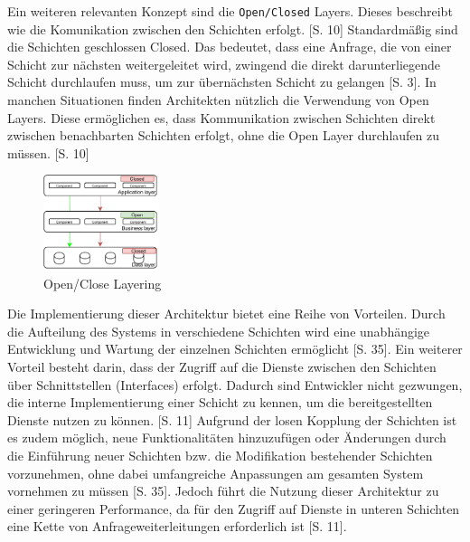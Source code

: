 \documentclass[acmtog]{acmart}
\begin{document}
Ein weiteren relevanten Konzept sind die \texttt{Open/Closed} Layers. Dieses beschreibt wie die 
Komunikation zwischen den Schichten erfolgt. \cite{layered4}[S. 10]
Standardmäßig sind die Schichten geschlossen Closed. Das bedeutet, dass eine Anfrage, die 
von einer Schicht zur nächsten weitergeleitet wird, zwingend die direkt darunterliegende Schicht 
durchlaufen muss, um zur übernächsten Schicht zu gelangen \cite{layered}[S. 3].
In manchen Situationen finden Architekten nützlich die Verwendung von Open Layers. Diese ermöglichen 
es, dass Kommunikation zwischen Schichten direkt zwischen benachbarten Schichten erfolgt, ohne die 
Open Layer durchlaufen zu müssen. \cite{layered4}[S. 10]


\begin{figure}[h!]
    \centering
    \includegraphics[width=0.3\textwidth]{images/layer2.pdf}
    \caption{Open/Close Layering}
    \label{fig:layered-request-flow}
\end{figure}


Die Implementierung dieser Architektur bietet eine Reihe von Vorteilen. Durch 
die Aufteilung des Systems in verschiedene Schichten wird eine unabhängige 
Entwicklung und Wartung der einzelnen Schichten ermöglicht \cite{layered2}[S. 35]. 
Ein weiterer Vorteil besteht darin, dass der Zugriff auf die Dienste zwischen den 
Schichten über Schnittstellen (Interfaces) erfolgt. Dadurch sind Entwickler nicht 
gezwungen, die interne Implementierung einer Schicht zu kennen, um die bereitgestellten 
Dienste nutzen zu können. \cite{layered4}[S. 11]
Aufgrund der losen Kopplung der Schichten ist es zudem möglich, neue Funktionalitäten
hinzuzufügen oder Änderungen durch die Einführung neuer Schichten bzw. die Modifikation 
bestehender Schichten vorzunehmen, ohne dabei umfangreiche Anpassungen am gesamten 
System vornehmen zu müssen \cite{layered2}[S. 35].
Jedoch führt die Nutzung dieser Architektur zu einer geringeren Performance, da für 
den Zugriff auf Dienste in unteren Schichten eine Kette von Anfrageweiterleitungen erforderlich ist \cite{layered4}[S. 11].\\
\end{document}
